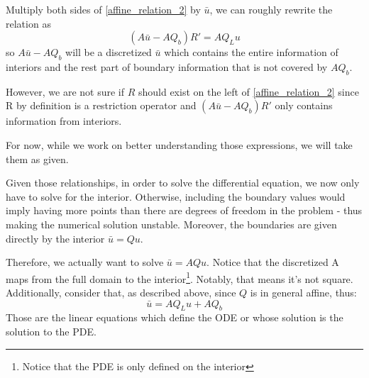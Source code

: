\documentclass[11pt]{article}
\begin{document}
\begin{itemize}
			Multiply both sides of \eqref{affine_relation_2} by $\bar{u}$, we can roughly rewrite the relation as
			\begin{equation}
			(A \bar{u}-A  Q_b)  R' = A  Q_L u
			\end{equation}
			so $A \bar{u}-A   Q_b$ will be a discretized $\bar{u}$ which contains the entire information of interiors and the rest part of boundary information that is not covered by $A  Q_b$.

			However, we are not sure if $R$ should exist on the left of \eqref{affine_relation_2} since R by definition is a restriction operator and $(A  \bar{u}-A  Q_b) R'$ only contains information from interiors.
			\iffalse %
			Also the size of the LHS of \eqref{affine_relation_2} is $M\times \bar{M}$, but the size of the RHS is $\bar{I}\times I$ .
			\fi
			For now, while we work on better understanding those expressions, we will take them as given.


			Given those relationships, in order to solve the differential equation, we now only have to solve for the interior. Otherwise, including the boundary values would imply having more points than there are degrees of freedom in the problem - thus making the numerical solution unstable. Moreover, the boundaries are given directly by the interior $\bar{u} = Q u$.

			Therefore, we actually want to solve $\bar{u} = A Q u$. Notice that the discretized A maps from the full domain to the interior\footnote{Notice that the PDE is only defined on the interior}. Notably, that means it's not square. Additionally, consider that, as described above, since $Q$ is in general affine, thus:
			\begin{equation}
			\bar{u} = A Q_L u + A Q_b
			\end{equation}
			Those are the linear equations which define the ODE or whose solution is the solution to the PDE.
		\end{itemize}
\end{document}
